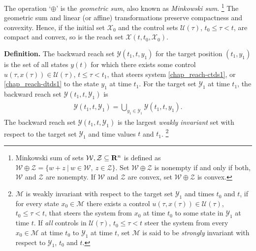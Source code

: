 \documentclass[letterpaper,10pt,english]{sphinxmanual}
\begin{document}
The operation ‘\(\oplus\)’ is the \emph{geometric sum}, also known as
\emph{Minkowski sum}. \footnote{
Minkowski sum of sets
\({\mathcal W}, {\mathcal Z}\subseteq {\bf R}^n\) is defined as
\({\mathcal W}\oplus {\mathcal Z}= \{w+z ~|~ w\in{\mathcal W}, ~ z\in{\mathcal Z}\}\).
Set \({\mathcal W}\oplus{\mathcal Z}\) is nonempty if and only if
both, \({\mathcal W}\) and \({\mathcal Z}\) are nonempty. If
\({\mathcal W}\) and \({\mathcal Z}\) are convex, set
\({\mathcal W}\oplus{\mathcal Z}\) is convex.
} The geometric sum and linear (or affine)
transformations preserve compactness and convexity. Hence, if the
initial set \({\mathcal X}_0\) and the control sets
\({\mathcal U}(\tau)\), \(t_0\leqslant\tau<t\), are compact and
convex, so is the reach set
\({\mathcal X}(t, t_0, {\mathcal X}_0)\).

\textbf{Definition.} The backward reach set \({\mathcal Y}(t_1, t, y_1)\) for the target
position \((t_1, y_1)\) is the set of all states \(y(t)\) for
which there exists some control
\(u(\tau, x(\tau))\in{\mathcal U}(\tau)\),
\(t\leqslant\tau<t_1\), that steers system \eqref{chap_reach-ctds1}, or \eqref{chap_reach-dtds1} to
the state \(y_1\) at time \(t_1\). For the target set
\({\mathcal Y}_1\) at time \(t_1\), the backward reach set
\({\mathcal Y}(t_1, t, {\mathcal Y}_1)\) is
\label{chap_reach:equation-def_olbrs}\begin{gather}
\begin{split}{\mathcal Y}(t_1, t, {\mathcal Y}_1) = \bigcup_{y_1\in{\mathcal Y}_1}{\mathcal Y}(t_1, t, y_1).\end{split}\label{chap_reach-def_olbrs}
\end{gather}
The backward reach set
\({\mathcal Y}(t_1, t, {\mathcal Y}_1)\) is the largest \emph{weakly
invariant} set with respect to the target set \({\mathcal Y}_1\) and
time values \(t\) and \(t_1\). \footnote{
\({\mathcal M}\) is weakly invariant with respect to the target
set \({\mathcal Y}_1\) and times \(t_0\) and \(t\), if
for every state \(x_0\in{\mathcal M}\) there exists a control
\(u(\tau, x(\tau))\in{\mathcal U}(\tau)\),
\(t_0\leqslant\tau< t\), that steers the system from \(x_0\)
at time \(t_0\) to some state in \({\mathcal Y}_1\) at time
\(t\). If \emph{all} controls in \({\mathcal U}(\tau)\),
\(t_0\leqslant\tau<t\) steer the system from every
\(x_0\in{\mathcal M}\) at time \(t_0\) to
\({\mathcal Y}_1\) at time \(t\), set \({\mathcal M}\) is
said to be \emph{strongly} invariant with respect to
\({\mathcal Y}_1\), \(t_0\) and \(t\).
}
\end{document}
